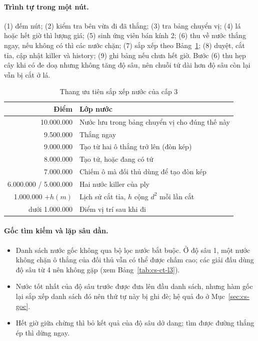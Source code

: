 \paragraph{Trình tự trong một nút.} (1) đếm nút; (2) kiểm tra bên vừa đi đã thắng; (3) tra bảng chuyển vị; (4) lá hoặc
hết giờ thì lượng giá; (5) sinh ứng viên bán kính 2; (6) thu về nước thắng ngay, nếu không có thì các nước chặn;
(7) sắp xếp theo Bảng~\ref{tab:cs-thu-tu}; (8) duyệt, cắt tỉa, cập nhật killer và history; (9) ghi bảng nếu chưa hết
giờ. Bước (6) thu hẹp cây khi có đe doạ nhưng không tăng độ sâu, nên chuỗi tứ dài hơn độ sâu còn lại vẫn bị cắt ở lá.
\begin{table}[H]
  \centering\small
  \caption{Thang ưu tiên sắp xếp nước của cấp 3}
  \label{tab:cs-thu-tu}
  \begin{tabular}{rl}
    \toprule
    Điểm & Lớp nước\\
    \midrule
    10.000.000 & Nước lưu trong bảng chuyển vị cho đúng thế này\\
    9.500.000 & Thắng ngay\\
    9.000.000 & Tạo từ hai ô thắng trở lên (đòn kép)\\
    8.000.000 & Tạo tứ, hoặc đang có tứ\\
    7.000.000 & Chiếm ô mà đối thủ dùng để tạo đòn kép\\
    6.000.000 / 5.000.000 & Hai nước killer của ply\\
    1.000.000 $+h(m)$ & Lịch sử cắt tỉa, $h$ cộng $d^2$ mỗi lần cắt\\
    dưới 1.000.000 & Điểm vị trí sau khi đi\\
    \bottomrule
  \end{tabular}
\end{table}

\paragraph{Gốc tìm kiếm và lặp sâu dần.}
\begin{itemize}
  \item Danh sách nước gốc không qua bộ lọc nước bắt buộc. Ở độ sâu 1, một nước không chặn ô thắng của đối thủ vẫn có
  thể được chấm cao; các giải đấu dùng độ sâu từ 4 nên không gặp (xem Bảng~\ref{tab:cs-ct-l3}).
  \item Nước tốt nhất của độ sâu trước được đưa lên đầu danh sách, nhưng hàm gốc lại sắp xếp danh sách đó nên thứ tự
  này bị ghi đè; hệ quả đo ở Mục~\ref{sec:cs-goc}.
  \item Hết giờ giữa chừng thì bỏ kết quả của độ sâu dở dang; tìm được đường thắng ép thì dừng ngay.
\end{itemize}

